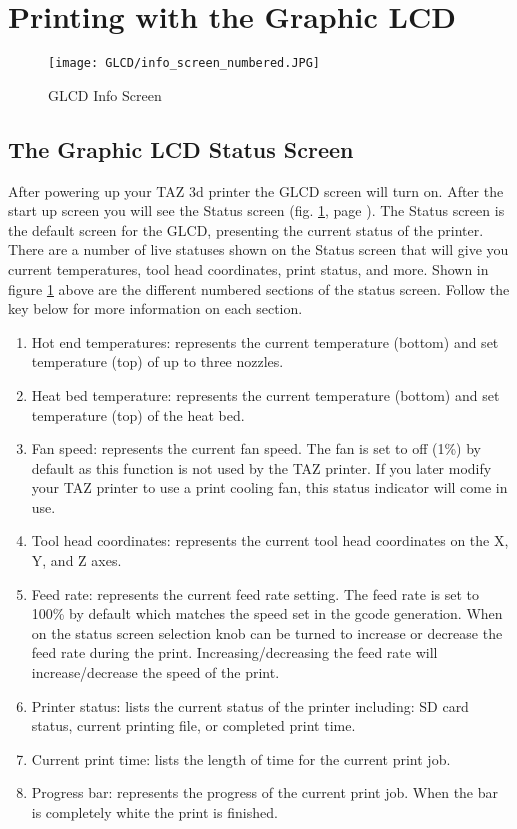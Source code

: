 \section{Printing with the Graphic LCD}
\begin{figure}[b]
\centering
\texttt{[image: GLCD/info\_screen\_numbered.JPG]}
\caption{GLCD Info Screen}
\label{fig:info_screen}
\end{figure}

\subsection{The Graphic LCD Status Screen}
After powering up your TAZ 3d printer the GLCD screen will turn on. After the start up screen you will see the Status screen (fig. \ref{fig:info_screen}, page \pageref{fig:info_screen}). The Status screen is the default screen for the GLCD, presenting the current status of the printer. There are a number of live statuses shown on the Status screen that will give you current temperatures, tool head coordinates, print status, and more. Shown in figure \ref{fig:info_screen} above are the different numbered sections of the status screen. Follow the key below for more information on each section.

\begin{enumerate}
\item Hot end temperatures: represents the current temperature (bottom) and set temperature (top) of up to three nozzles.
\item Heat bed temperature: represents the current temperature (bottom) and set temperature (top) of the heat bed.
\item Fan speed: represents the current fan speed. The fan is set to off (1\%) by default as this function is not used by the TAZ printer. If you later modify your TAZ printer to use a print cooling fan, this status indicator will come in use.
\item Tool head coordinates: represents the current tool head coordinates on the X, Y, and Z axes.
\item Feed rate: represents the current feed rate setting. The feed rate is set to 100\% by default which matches the speed set in the gcode generation. When on the status screen selection knob can be turned to increase or decrease the feed rate during the print. Increasing/decreasing the feed rate will increase/decrease the speed of the print.
\item Printer status: lists the current status of the printer including: SD card status, current printing file, or completed print time.
\item Current print time: lists the length of time for the current print job.
\item Progress bar: represents the progress of the current print job. When the bar is completely white the print is finished.
\end{enumerate}


